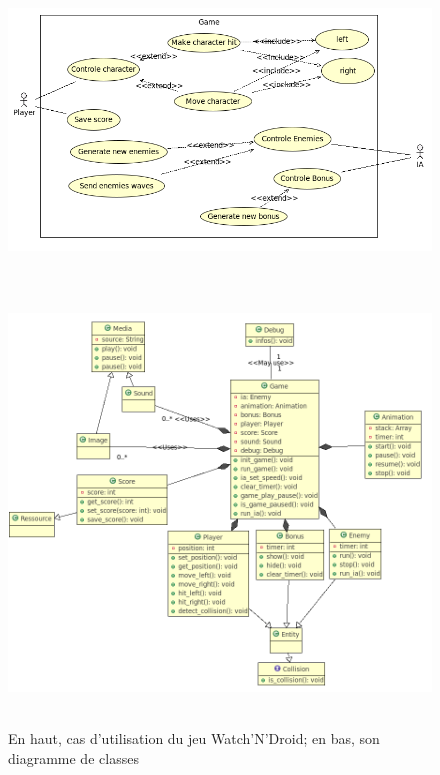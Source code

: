 \begin{figure}[h]
 \centering
 \includegraphics[height=8.5cm]{../umls/UML_images/WatchNDroid/utilisation} \hfill
 \includegraphics[height=11cm]{../umls/UML_images/WatchNDroid/class} \hfill
 \caption{En haut, cas d'utilisation du jeu Watch'N'Droid; en bas, son diagramme de classes}
\end{figure}

